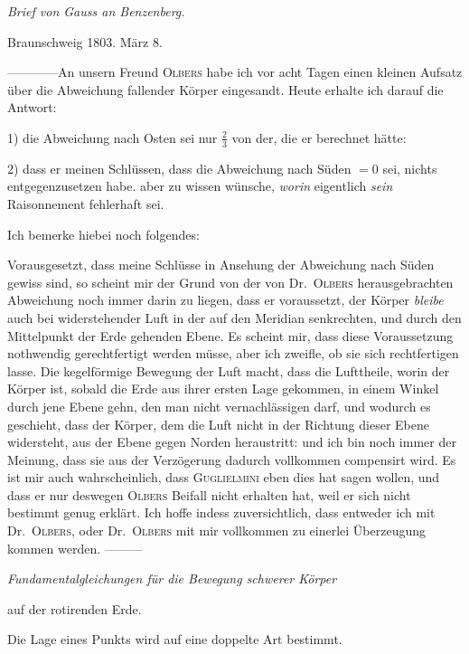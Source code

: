 \begin{center}{\large\itshape Brief von Gauss an Benzenberg.}\end{center}
\begin{flushright}Braunschweig 1803. März 8.\end{flushright}
—\quad—\quad—\quad—\quad An unsern Freund \textsc{Olbers} habe ich vor acht Tagen einen kleinen Aufsatz über die Abweichung fallender Körper eingesandt. Heute erhalte ich darauf die Antwort:

1) die Abweichung nach Osten sei nur $\tfrac23$ von der, die er berechnet hätte:

2) dass er meinen Schlüssen, dass die Abweichung nach Süden $=0$ sei, nichts entgegenzusetzen habe. aber zu wissen wünsche, \textit{worin} eigentlich \textit{sein} Raisonnement fehlerhaft sei.

Ich bemerke hiebei noch folgendes:

Vorausgesetzt, dass meine Schlüsse in Ansehung der Abweichung nach Süden gewiss sind, so scheint mir der Grund von der von Dr.\ \textsc{Olbers} herausgebrachten Abweichung noch immer darin zu liegen, dass er voraussetzt, der Körper \textit{bleibe} auch bei widerstehender Luft in der auf den Meridian senkrechten, und durch den Mittelpunkt der Erde gehenden Ebene. Es scheint mir, dass diese Voraussetzung nothwendig gerechtfertigt werden müsse, aber ich zweifle, ob sie sich rechtfertigen lasse. Die kegelförmige Bewegung der Luft macht, dass die Lufttheile, worin der Körper ist, sobald die Erde aus ihrer ersten Lage gekommen, in einem Winkel durch jene Ebene gehn, den man nicht vernachlässigen darf, und wodurch es geschieht, dass der Körper, dem die Luft nicht in der Richtung dieser Ebene widersteht, aus der Ebene gegen Norden heraustritt: und ich bin noch immer der Meinung, dass sie aus der Verzögerung dadurch vollkommen compensirt wird. Es ist mir auch wahrscheinlich, dass \textsc{Guglielmini} eben dies hat sagen wollen, und dass er nur deswegen \textsc{Olbers} Beifall nicht erhalten hat, weil er sich nicht bestimmt genug erklärt. Ich hoffe indess zuversichtlich, dass entweder ich mit Dr.\ \textsc{Olbers}, oder Dr.\ \textsc{Olbers} mit mir vollkommen zu einerlei Überzeugung kommen werden. —\quad—\quad—

\begin{center}{\large\itshape Fundamentalgleichungen für die Bewegung schwerer Körper\par auf der rotirenden Erde.}\end{center}
Die Lage eines Punkts wird auf eine doppelte Art bestimmt.

